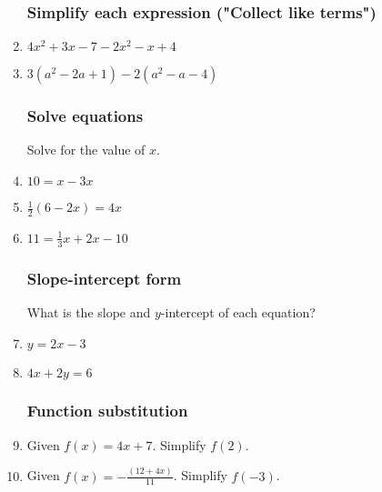 \documentclass[12pt, oneside]{article}
\begin{document}
\begin{enumerate}
\subsubsection*{Simplify each expression ("Collect like terms")}

  \item $4x^2+3x -7 -2x^2-x+4$ \vspace{3cm}
  \item $3(a^2-2a +1) -2(a^2-a-4)$ \vspace{3cm}

\subsubsection*{Solve equations}

Solve for the value of $x$.
\item   $10=x-3x$ \vspace{3cm}
\item   $\frac{1}{2}(6-2x)=4x$ \vspace{3cm}
\item   $11=\frac{1}{3}x+2x-10$ \vspace{3cm}

\newpage
\subsubsection*{Slope-intercept form}

What is the slope and $y$-intercept of each equation?
\item   $y=2x-3$ \vspace{2cm}
\item   $4x+2y=6$ \vspace{3cm}


\subsubsection*{Function substitution}
\item Given $f(x)=4x+7$. Simplify $f(2)$. \vspace{4cm}
\item Given $\displaystyle f(x)=-\frac{(12+4x)}{11}$. Simplify $f(-3)$.

\newpage

\end{enumerate}
\end{document}
